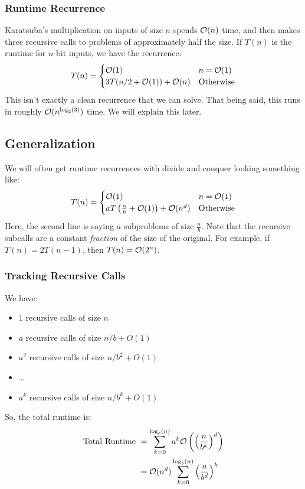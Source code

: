 \documentclass[letterpaper]{article}
\begin{document}
\subsubsection{Runtime Recurrence}
Karatsuba's multiplication on inputs of size $n$ spends $\mathcal{O}(n)$ time, and then makes three recursive calls to problems of approximately half the size. If $T(n)$ is the runtime for $n$-bit inputs, we have the recurrence:
\[T(n) = \begin{cases}
    \mathcal{O}(1) & n = \mathcal{O}(1) \\ 
    3T(n / 2 + \mathcal{O}(1)) + \mathcal{O}(n) & \text{Otherwise}
\end{cases}\]
This isn't exactly a clean recurrence that we can solve. That being said, this runs in roughly $\mathcal{O}(n^{\log_{2}(3)})$ time. We will explain this later. 

\subsection{Generalization}
We will often get runtime recurrences with divide and conquer looking something like: 
\[T(n) = \begin{cases}
    \mathcal{O}(1) & n = \mathcal{O}(1) \\ 
    aT\left(\frac{n}{b} + \mathcal{O}(1)\right) + \mathcal{O}(n^d) & \text{Otherwise}
\end{cases}\]
Here, the second line is saying $a$ subproblems of size $\frac{n}{b}$. Note that the recursive subcalls are a constant \emph{fraction} of the size of the original. For example, if $T(n) = 2T(n - 1)$, then $T(n) = \mathcal{O}(2^n)$. 

\subsubsection{Tracking Recursive Calls}
We have: 
\begin{itemize}
    \item 1 recursive calls of size $n$
    \item $a$ recursive calls of size $n / b + O(1)$
    \item $a^2$ recursive calls of size $n / b^2 + O(1)$
    \item \dots
    \item $a^k$ recursive calls of size $n / b^k + O(1)$
\end{itemize}
So, the total runtime is: 
\begin{equation*}
    \begin{aligned}
        \text{Total Runtime } &= \sum_{k = 0}^{\log_{b}(n)} a^k \mathcal{O}\left(\left(\frac{n}{b^k}\right)^d\right) \\ 
            &= \mathcal{O}(n^d) \sum_{k = 0}^{\log_{b}(n)} \left(\frac{a}{b^d}\right)^k
    \end{aligned}
\end{equation*}
\end{document}

